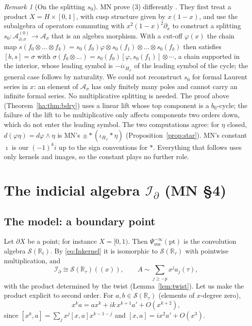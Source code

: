\documentclass[11pt,oneside,reqno]{article}
\newcommand{\R}{\mathbb R}
\newcommand{\cS}{\mathcal S}
\newcommand{\Id}{\mathcal I_\partial}
\newcommand{\As}{\mathcal A_\sigma}
\newcommand{\Ads}{\mathcal A_{\partial,\sigma}}
\newcommand{\Psis}{\Psi_{\mathrm{sus}}}
\theoremstyle{plain}
\theoremstyle{definition}
\theoremstyle{remark}
\newtheorem{remark}[theorem]{Remark}
\newcommand{\Lser}[1]{(\!(#1)\!)}
\begin{document}
\begin{remark}[On the splitting \(s_0\)]\label{rem:s0}
MN prove (3) differently \cite[pp.~14--15]{MN}. They first treat a
product \(X=H\times[0,1]\), with cusp structure given by \(x(1-x)\), and
use the subalgebra of operators commuting with \(x^2(1-x)^2\partial_x\)
to construct a splitting \(s_0:\Ads^{(0)}\to\As\) that is an algebra
morphism. With a cut-off \(\varphi(x)\) the chain map
\(s(f_0\otimes\dots\otimes f_k)=s_0(f_0)\varphi\otimes s_0(f_1)\otimes
\dots\otimes s_0(f_k)\) then satisfies \([b,s]=\sigma\) with
\(\sigma(f_0\otimes\dots)=s_0(f_0)[\varphi,s_0(f_1)]\otimes\cdots\), a
chain supported in the interior, whose leading symbol is
\(-i\iota_{H_\varphi}\) of the leading symbol of the cycle; the general
case follows by naturality. We could not reconstruct \(s_0\) for formal
Laurent series in \(x\): an element of \(\As\) has only finitely many
poles and cannot carry an infinite formal series. No multiplicative
splitting is needed. The proof above (Theorem~\ref{ha:thm:bdry}) uses a
linear lift whose top component is a \(b_0\)-cycle; the failure of the
lift to be multiplicative only affects components two orders down, which
do not enter the leading symbol. The two computations agree: for
\(\eta\) closed, \(d(\varphi\eta)=d\varphi\wedge\eta\) is MN's
\(\pm*(\iota_{H_\varphi}*\eta)\) (Proposition~\ref{prop:star}). MN's
constant \(\imath\) is our \((-1)^ki\) up to the sign conventions for
\(*\). Everything that follows uses only kernels and images, so the
constant plays no further role.
\end{remark}

\section{The indicial algebra \texorpdfstring{\(\Id\)}{Id} (MN \S4)}
\label{sec:indicial}

\subsection{The model: a boundary point}\label{subsec:Idpoint}
Let \(\partial X\) be a point; for instance \(X=[0,1)\). Then
\(\Psis^{-\infty}(\mathrm{pt})\) is the convolution algebra \(\cS(\R_t)\).
By \eqref{eq:Inkernel} it is isomorphic to \(\cS(\R_\tau)\) with
pointwise multiplication, and
\[
 \Id\cong\cS(\R_\tau)\Lser{x},\qquad A\sim\sum_{j\ge-p}x^ja_j(\tau),
\]
with the product determined by the twist (Lemma~\ref{lem:twist}). Let us
make the product explicit to second order. For \(a,b\in\cS(\R_\tau)\)
(elements of \(x\)-degree zero),
\[
 x^ka=ax^k+ik\,x^{k+1}a'+O(x^{k+2}),
\]
since \([x^k,a]=\sum_jx^j[x,a]x^{k-1-j}\) and \([x,a]=ix^2a'+O(x^3)\).
\end{document}
